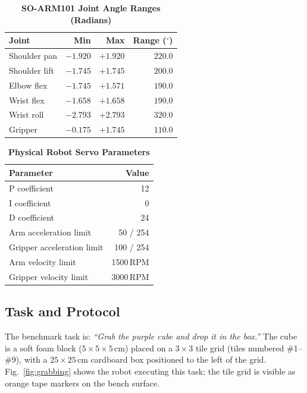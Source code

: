 \documentclass[10pt,journal]{IEEEtran}
\begin{document}
\begin{table}[t]
\caption{\textbf{SO-ARM101 Joint Angle Ranges (Radians)}}
\label{tab:joints}
\centering
\begin{tabular}{lrrr}
\hline
\textbf{Joint} & \textbf{Min} & \textbf{Max} & \textbf{Range ($^{\circ}$)} \\
\hline
Shoulder pan   & $-1.920$ & $+1.920$ & $220.0$ \\
Shoulder lift  & $-1.745$ & $+1.745$ & $200.0$ \\
Elbow flex     & $-1.745$ & $+1.571$ & $190.0$ \\
Wrist flex     & $-1.658$ & $+1.658$ & $190.0$ \\
Wrist roll     & $-2.793$ & $+2.793$ & $320.0$ \\
Gripper        & $-0.175$ & $+1.745$ & $110.0$ \\
\hline
\end{tabular}
\end{table}

\begin{table}[t]
\caption{\textbf{Physical Robot Servo Parameters}}
\label{tab:servo}
\centering
\begin{tabular}{lr}
\hline
\textbf{Parameter} & \textbf{Value} \\
\hline
P coefficient               & 12 \\
I coefficient               & 0 \\
D coefficient               & 24 \\
Arm acceleration limit      & 50 / 254 \\
Gripper acceleration limit  & 100 / 254 \\
Arm velocity limit          & 1500\,RPM \\
Gripper velocity limit      & 3000\,RPM \\
\hline
\end{tabular}
\end{table}

\subsection{Task and Protocol}
\label{sec:task}

The benchmark task is: \emph{``Grab the purple cube and drop it in the
box.''} The cube is a soft foam block ($5 \times 5 \times 5$\,cm) placed
on a $3 \times 3$ tile grid (tiles numbered \#1--\#9), with a
$25 \times 25$\,cm cardboard box positioned to the left of the grid.
Fig.~\ref{fig:grabbing} shows the robot executing this task; the
tile grid is visible as orange tape markers on the bench surface.
\end{document}
